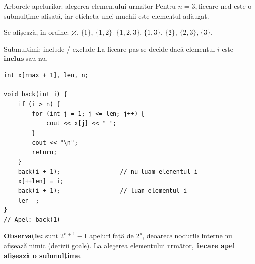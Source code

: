 \documentclass[8pt,mathserif]{beamer}
\begin{document}
\begin{frame}{Arborele apelurilor: alegerea elementului următor}
  Pentru $n = 3$, fiecare nod este o submulțime afișată, iar eticheta unei muchii este elementul adăugat.
  \begin{center}
  \end{center}
  Se afișează, în ordine: $\varnothing$, $\{1\}$, $\{1,2\}$, $\{1,2,3\}$, $\{1,3\}$, $\{2\}$, $\{2,3\}$, $\{3\}$.
\end{frame}

\begin{frame}[fragile]{Submulțimi: include / exclude}
  La fiecare pas se decide dacă elementul $i$ este \textbf{inclus} sau nu.
  \begin{lstlisting}
int x[nmax + 1], len, n;

void back(int i) {
    if (i > n) {
        for (int j = 1; j <= len; j++) {
            cout << x[j] << " ";
        }
        cout << "\n";
        return;
    }
    back(i + 1);                 // nu luam elementul i
    x[++len] = i;
    back(i + 1);                 // luam elementul i
    len--;
}
// Apel: back(1)
  \end{lstlisting}
  \textbf{Observație:} sunt $2^{n+1} - 1$ apeluri față de $2^n$, deoarece nodurile interne nu afișează nimic (decizii goale). La alegerea elementului următor, \textbf{fiecare apel afișează o submulțime}.
\end{frame}
\end{document}
